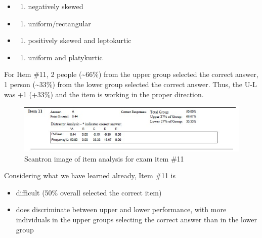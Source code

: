 \documentclass[
  english,
]{book}
\providecommand{\tightlist}{%
  \setlength{\itemsep}{0pt}\setlength{\parskip}{0pt}}
\begin{document}
\begin{itemize}
\item
  \begin{enumerate}
  \def\labelenumi{\alph{enumi})}
  \tightlist
  \item
    negatively skewed
  \end{enumerate}
\item
  \begin{enumerate}
  \def\labelenumi{\alph{enumi})}
  \setcounter{enumi}{1}
  \tightlist
  \item
    uniform/rectangular
  \end{enumerate}
\item
  \begin{enumerate}
  \def\labelenumi{\alph{enumi})}
  \setcounter{enumi}{2}
  \tightlist
  \item
    positively skewed and leptokurtic
  \end{enumerate}
\item
  \begin{enumerate}
  \def\labelenumi{\alph{enumi})}
  \setcounter{enumi}{3}
  \tightlist
  \item
    uniform and platykurtic
  \end{enumerate}
\end{itemize}

For Item \#11, 2 people (\textasciitilde66\%) from the upper group selected the correct answer, 1 person (\textasciitilde33\%) from the lower group selected the correct answer. Thus, the U-L was +1 (+33\%) and the item is working in the proper direction.

\begin{figure}
\centering
\includegraphics{images/ItemAnalExam/Item11.jpg}
\caption{Scantron image of item analysis for exam item \#11}
\end{figure}

Considering what we have learned already, Item \#11 is

\begin{itemize}
\tightlist
\item
  difficult (50\% overall selected the correct item)
\item
  does discriminate between upper and lower performance, with more individuals in the upper groups selecting the correct answer than in the lower group
\end{itemize}
\end{document}
